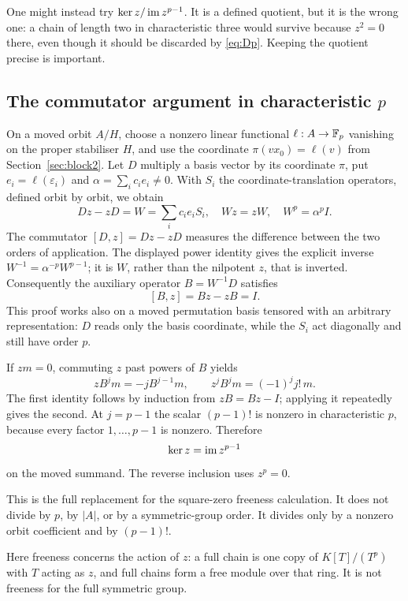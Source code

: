 \documentclass[11pt,a4paper]{article}
\theoremstyle{definition}\newtheorem{definition}[theorem]{Definition}
\theoremstyle{remark}\newtheorem{remark}[theorem]{Remark}
\begin{document}
One might instead try $\ker z/\operatorname{im} z^{p-1}$. It is a defined quotient, but it is the wrong one: a chain of length two in characteristic three would survive because $z^2=0$ there, even though it should be discarded by \eqref{eq:Dp}. Keeping the quotient precise is important.

\subsection{The commutator argument in characteristic \texorpdfstring{$p$}{p}}\label{sec:commutatorp}
On a moved orbit $A/H$, choose a nonzero linear functional $\ell:A\to\mathbb F_p$ vanishing on the proper stabiliser $H$, and use the coordinate $\pi(vx_0)=\ell(v)$ from Section~\ref{sec:block2}. Let $D$ multiply a basis vector by its coordinate $\pi$, put $e_i=\ell(\varepsilon_i)$ and $\alpha=\sum_i c_ie_i\ne0$. With $S_i$ the coordinate-translation operators, defined orbit by orbit, we obtain
\[Dz-zD=W=\sum_i c_ie_iS_i,\quad Wz=zW,\quad W^p=\alpha^pI.
\]
The commutator $[D,z]=Dz-zD$ measures the difference between the
two orders of application. The displayed power identity gives the
explicit inverse $W^{-1}=\alpha^{-p}W^{p-1}$; it is $W$, rather
than the nilpotent $z$, that is inverted.
Consequently the auxiliary operator $B=W^{-1}D$ satisfies
\begin{equation}\label{eq:commutator}[B,z]=Bz-zB=I.\end{equation}
This proof works also on a moved permutation basis tensored with an arbitrary representation: $D$ reads only the basis coordinate, while the $S_i$ act diagonally and still have order $p$.

If $zm=0$, commuting $z$ past powers of $B$ yields
\[zB^jm=-jB^{j-1}m,
\qquad z^jB^jm=(-1)^jj!\,m.
\]
The first identity follows by induction from $zB=Bz-I$; applying it repeatedly gives the second. At $j=p-1$ the scalar $(p-1)!$ is nonzero in characteristic $p$, because every factor $1,\ldots,p-1$ is nonzero. Therefore
\begin{equation}\label{eq:freep}\ker z=\operatorname{im} z^{p-1}
\end{equation}
on the moved summand. The reverse inclusion uses $z^p=0$.

This is the full replacement for the square-zero freeness calculation. It does not divide by $p$, by $|A|$, or by a symmetric-group order. It divides only by a nonzero orbit coefficient and by $(p-1)!$.

Here freeness concerns the action of $z$: a full chain is one copy of
$K[T]/(T^p)$ with $T$ acting as $z$, and full chains form a free
module over that ring. It is not freeness for the full symmetric group.
\end{document}
